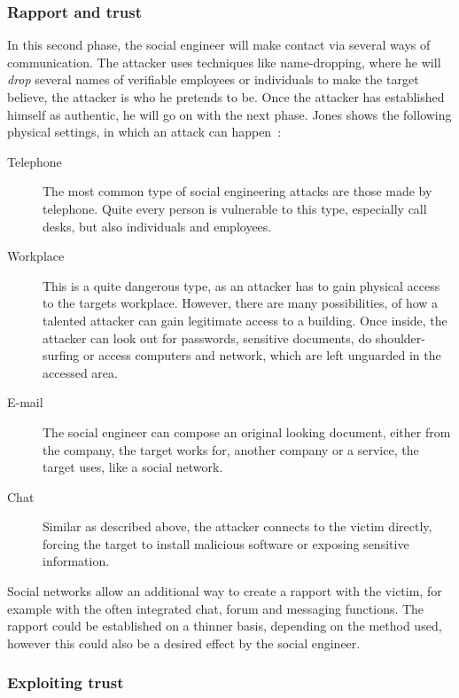 \subsubsection{Rapport and trust}

In this second phase, the social engineer will make contact via several ways of
communication. The attacker uses techniques like name-dropping, where he will
\textit{drop} several names of verifiable employees or individuals to make the
target believe, the attacker is who he pretends to be. Once the attacker has
established himself as authentic, he will go on with the next phase. Jones
shows the following physical settings, in which an attack can happen~\cite{jones2004}:

\begin{description}
\item[Telephone] The most common type of social engineering attacks are those
  made by telephone. Quite every person is vulnerable to this type,
  especially call desks, but also individuals and employees.
\item[Workplace] This is a quite dangerous type, as an attacker has to gain
  physical access to the targets workplace. However, there are many
  possibilities, of how a talented attacker can gain legitimate access to a building.
  Once inside, the attacker can look out for passwords, sensitive documents,
  do shoulder-surfing or access computers and network, which are left
  unguarded in the accessed area.
\item[E-mail] The social engineer can compose an original looking document,
  either from the company, the target works for, another company or a service,
  the target uses, like a social network.
\item[Chat] Similar as described above, the attacker connects to the victim directly,
  forcing the target to install malicious software or exposing sensitive
  information.
\end{description}

Social networks allow an additional way to create a rapport with the victim,
for example with the often integrated chat, forum and messaging functions. The
rapport could be established on a thinner basis, depending on the method used,
however this could also be a desired effect by the social engineer.


\subsubsection{Exploiting trust}

